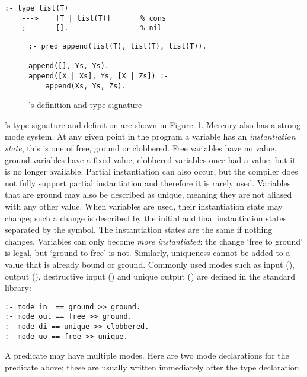 \begin{verbatim}
:- type list(T)
    --->    [T | list(T)]       % cons
    ;       [].                 % nil
\end{verbatim}

\begin{figure}
\begin{verbatim}
:- pred append(list(T), list(T), list(T)).

append([], Ys, Ys).
append([X | Xs], Ys, [X | Zs]) :-
    append(Xs, Ys, Zs).
\end{verbatim}
\caption{'s definition and type signature}
\label{fig:append_type_and_defn}
\end{figure}

\noindent
{}'s type signature and definition are shown in
Figure~\ref{fig:append_type_and_defn}.
Mercury also has a strong mode system.
At any given point in the program a variable has an \emph{instantiation
state},
this is one of free, ground or clobbered.
Free variables have no value,
ground variables have a fixed value,
clobbered variables once had a value, but it is no longer available.
Partial instantiation can also occur,
but the compiler does not fully support partial instantiation
and therefore it is rarely used.
Variables that are ground may also be described as unique,
meaning they are not aliased with any other value.
When variables are used, their instantiation state may change;
such a change is described by the initial and final instantiation states
separated by the \code{>>} symbol.
The instantiation states are the same if nothing changes.
Variables can only become \emph{more instantiated}:
the change `free to ground' is legal, but `ground to free' is not.
Similarly, uniqueness cannot be added to a value that is already
bound or ground.
Commonly used modes such as input (), output (),
destructive input () and unique output () are
defined in the standard library:

\begin{verbatim}
:- mode in  == ground >> ground.
:- mode out == free >> ground.
:- mode di == unique >> clobbered.
:- mode uo == free >> unique.
\end{verbatim}

\noindent
A predicate may have multiple modes.
Here are two mode declarations for the  predicate above;
these are usually written immediately after the type declaration.

